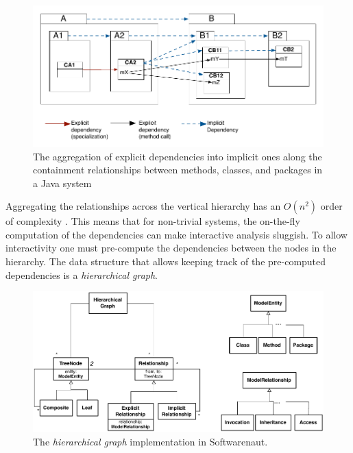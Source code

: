 \documentclass[preprint,12pt]{elsarticle}
\begin{document}
\begin{figure}[ht]
\begin{center}
\includegraphics[width=0.9\linewidth]{DependencyAggregation}
\caption{The aggregation of explicit dependencies into implicit ones along the containment relationships between methods, classes, and packages in a Java system}
\end{center}
\end{figure}


Aggregating the relationships across the vertical hierarchy has an $O(n^2)$ order of complexity \cite{buchsbaum-hierarchicalgraphs}. This means that for non-trivial systems, the on-the-fly computation of the dependencies can make interactive analysis sluggish. To allow interactivity one must pre-compute the dependencies between the nodes in the hierarchy. The data structure that allows keeping track of the pre-computed dependencies is a {\em hierarchical graph}. 



\begin{figure}[h]
\begin{center}
\includegraphics[width=0.8\linewidth]{HigraphModel}
\caption{The {\em hierarchical graph} implementation in Softwarenaut.}
\end{center}
\end{figure}
\end{document}
